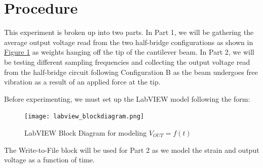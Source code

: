 \documentclass{article}
\begin{document}
\section{Procedure}
This experiment is broken up into two parts. In Part 1, we will be gathering the average output voltage read from the two half-bridge configurations as shown in \hyperlink{fig1}{Figure 1} as weights hanging off the tip of the cantilever beam. In Part 2, we will be testing different sampling frequencies and collecting the output voltage read from the half-bridge circuit following Configuration B as the beam undergoes free vibration as a result of an applied force at the tip. 
\vspace{2.5mm}

Before experimenting, we must set up the LabVIEW model following the form:

\begin{center}
\end{center}

\begin{figure}[H]
    \centering
    \texttt{[image: labview\_blockdiagram.png]}
    \caption{LabVIEW Block Diagram for modeling $V_{OUT}=f(t)$}
\end{figure}

The Write-to-File block will be used for Part 2 as we model the strain and output voltage as a function of time.
\end{document}
